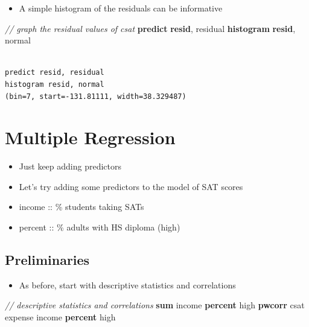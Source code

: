 \documentclass[
]{book}
\newenvironment{Shaded}{\begin{snugshade}}{\end{snugshade}}
\newcommand{\CommentTok}[1]{\textcolor[rgb]{0.56,0.35,0.01}{\textit{#1}}}
\newcommand{\FunctionTok}[1]{\textcolor[rgb]{0.00,0.00,0.00}{#1}}
\newcommand{\KeywordTok}[1]{\textcolor[rgb]{0.13,0.29,0.53}{\textbf{#1}}}
\newcommand{\NormalTok}[1]{#1}
\providecommand{\tightlist}{%
  \setlength{\itemsep}{0pt}\setlength{\parskip}{0pt}}
\begin{document}
\begin{itemize}
\tightlist
\item
  A simple histogram of the residuals can be informative
\end{itemize}

\begin{Shaded}
\begin{Highlighting}[]
  \CommentTok{// graph the residual values of csat}
  \KeywordTok{predict} \KeywordTok{resid}\NormalTok{, residual}
  \KeywordTok{histogram} \KeywordTok{resid}\NormalTok{, }\FunctionTok{normal} 
\end{Highlighting}
\end{Shaded}

\begin{verbatim}

predict resid, residual
histogram resid, normal
(bin=7, start=-131.81111, width=38.329487)
\end{verbatim}

\hypertarget{multiple-regression}{%
\section{Multiple Regression}\label{multiple-regression}}

\begin{itemize}
\tightlist
\item
  Just keep adding predictors
\item
  Let's try adding some predictors to the model of SAT scores
\item
  income :: \% students taking SATs
\item
  percent :: \% adults with HS diploma (high)
\end{itemize}

\hypertarget{preliminaries-1}{%
\subsection{Preliminaries}\label{preliminaries-1}}

\begin{itemize}
\tightlist
\item
  As before, start with descriptive statistics and correlations
\end{itemize}

\begin{Shaded}
\begin{Highlighting}[]
  \CommentTok{// descriptive statistics and correlations}
  \KeywordTok{sum}\NormalTok{ income }\KeywordTok{percent}\NormalTok{ high}
  \KeywordTok{pwcorr}\NormalTok{ csat expense income }\KeywordTok{percent}\NormalTok{ high}
\end{Highlighting}
\end{Shaded}
\end{document}

